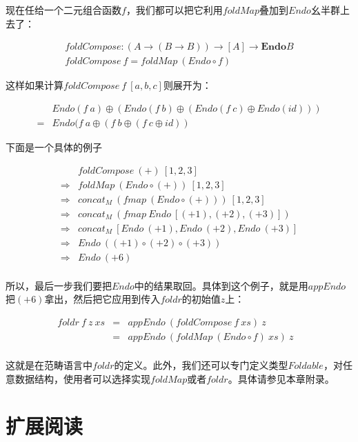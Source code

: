 \documentclass{article}
\begin{document}
现在任给一个二元组合函数$f$，我们都可以把它利用$foldMap$叠加到$Endo$幺半群上去了：

\[
\begin{array}{l}
foldCompose : (A \to (B \to B)) \to [A] \to \mathbf{Endo}B \\
foldCompose\ f = foldMap\ (Endo \circ f)
\end{array}
\]

这样如果计算$foldCompose\ f\ [a, b, c]$则展开为：

\[
\begin{array}{cl}
  & Endo(f\ a) \oplus (Endo(f\ b) \oplus (Endo(f\ c) \oplus Endo(id))) \\
= & Endo(f\ a \oplus (f\ b \oplus (f\ c \oplus id))
\end{array}
\]

下面是一个具体的例子

\[
\begin{array}{cl}
            & foldCompose\ (+)\ [1, 2, 3] \\
\Rightarrow & foldMap\ (Endo \circ (+))\ [1, 2, 3] \\
\Rightarrow & concat_M\ (fmap\ (Endo \circ (+)))\ [1, 2, 3] \\
\Rightarrow & concat_M\ (fmap\ Endo\ [(+1), (+2), (+3)]) \\
\Rightarrow & concat_M\ [Endo\ (+1), Endo\ (+2), Endo\ (+3)] \\
\Rightarrow & Endo\ ((+1) \circ (+2) \circ (+3)) \\
\Rightarrow & Endo\ (+6) \\
\end{array}
\]

所以，最后一步我们要把$Endo$中的结果取回。具体到这个例子，就是用$appEndo$把$(+6)$拿出，然后把它应用到传入$foldr$的初始值$z$上：

\[
\begin{array}{rcll}
foldr\ f\ z\ xs
  & = & appEndo\ (foldCompose\ f\ xs)\ z & \\
  & = & appEndo\ (foldMap\ (Endo \circ f)\ xs)\ z \\
\end{array}
\]

这就是在范畴语言中$foldr$的定义。此外，我们还可以专门定义类型$Foldable$，对任意数据结构，使用者可以选择实现$foldMap$或者$foldr$。具体请参见本章附录。

\section{扩展阅读}
\end{document}
